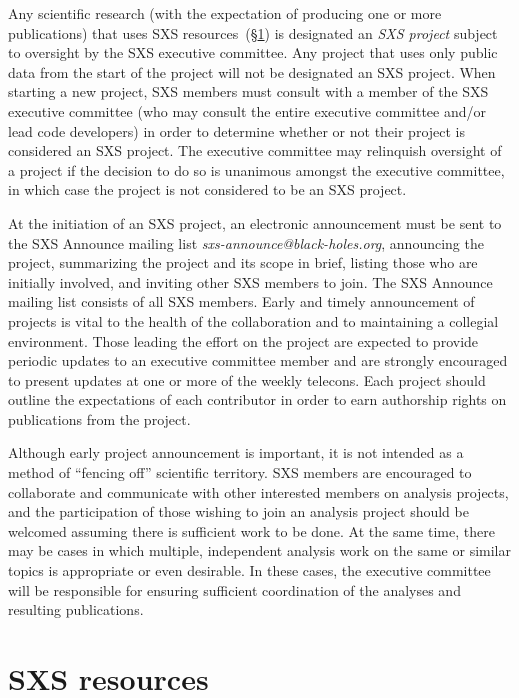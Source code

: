 \documentclass[12pt]{article}
\begin{document}
Any scientific research (with the expectation of producing one or more
publications) that uses SXS resources~(\S\ref{sec:resources}) is
designated an \emph{SXS project} subject to oversight by the SXS
executive committee.  Any project that uses only public data from the
start of the project will not be designated an SXS project.  When
starting a new project, SXS members must consult with a member of the
SXS executive committee (who may consult the entire executive
committee and/or lead code developers) in order to determine whether
or not their project is considered an SXS project.  The executive
committee may relinquish oversight of a project if the decision to do
so is unanimous amongst the executive committee, in which case the
project is not considered to be an SXS project.

At the initiation of an SXS project, an electronic announcement must
be sent to the SXS Announce mailing list
\emph{sxs-announce@black-holes.org}, announcing the project,
summarizing the project and its scope in brief, listing those who are
initially involved, and inviting other SXS members to join.  The SXS
Announce mailing list consists of all SXS members.  Early and timely
announcement of projects is vital to the health of the collaboration
and to maintaining a collegial environment. Those leading the effort
on the project are expected to provide periodic updates to an
executive committee member and are strongly encouraged to present
updates at one or more of the weekly telecons.  Each project should
outline the expectations of each contributor in order to earn
authorship rights on publications from the project.

Although early project announcement is important, it is not intended
as a method of ``fencing off'' scientific territory. SXS members are
encouraged to collaborate and communicate with other interested
members on analysis projects, and the participation of those wishing
to join an analysis project should be welcomed assuming there is
sufficient work to be done. At the same time, there may be cases in
which multiple, independent analysis work on the same or similar
topics is appropriate or even desirable. In these cases, the executive
committee will be responsible for ensuring sufficient coordination of
the analyses and resulting publications.


\section{SXS resources}\label{sec:resources}
\end{document}
